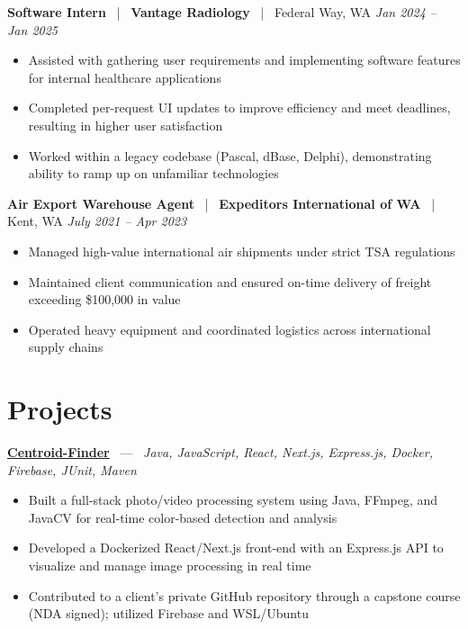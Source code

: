 \documentclass[10pt, letterpaper]{article}
\newcommand{\jobhead}[4]{%
  \vspace{5pt}%
  {\bfseries\color{dark}#1}%
  ~{\color{light}|}~%
  {\bfseries\color{navy}#2}%
  ~{\color{light}|}~%
  {\color{light}#3}%
  \hfill{\color{light}\small\textit{#4}}\\[-2pt]%
}
\newcommand{\projhead}[3]{%
  \vspace{5pt}%
  {\bfseries\color{dark}\href{#2}{#1}}%
  ~{\color{light}---}~%
  {\color{light}\small\textit{#3}}\\[-2pt]%
}
\begin{document}
\jobhead{Software Intern}{Vantage Radiology}{Federal Way, WA}{Jan 2024 – Jan 2025}
\begin{itemize}
  \item Assisted with gathering user requirements and implementing software features for internal healthcare applications
  \item Completed per-request UI updates to improve efficiency and meet deadlines, resulting in higher user satisfaction
  \item Worked within a legacy codebase (Pascal, dBase, Delphi), demonstrating ability to ramp up on unfamiliar technologies
\end{itemize}

\jobhead{Air Export Warehouse Agent}{Expeditors International of WA}{Kent, WA}{July 2021 – Apr 2023}
\begin{itemize}
  \item Managed high-value international air shipments under strict TSA regulations
  \item Maintained client communication and ensured on-time delivery of freight exceeding \$100,000 in value
  \item Operated heavy equipment and coordinated logistics across international supply chains
\end{itemize}

\section{Projects}

\projhead{Centroid-Finder}{https://github.com/xavierb117/centroid-finder}{Java, JavaScript, React, Next.js, Express.js, Docker, Firebase, JUnit, Maven}
\begin{itemize}
  \item Built a full-stack photo/video processing system using Java, FFmpeg, and JavaCV for real-time color-based detection and analysis
  \item Developed a Dockerized React/Next.js front-end with an Express.js API to visualize and manage image processing in real time
  \item Contributed to a client's private GitHub repository through a capstone course (NDA signed); utilized Firebase and WSL/Ubuntu
\end{itemize}
\end{document}

